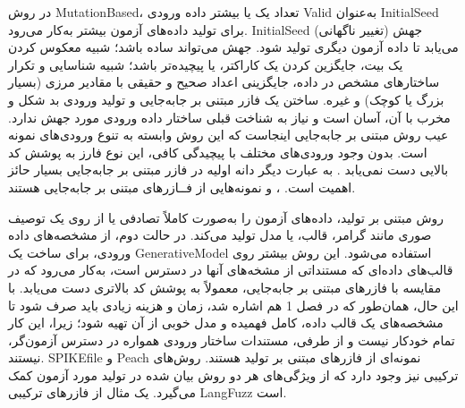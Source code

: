 در روش \gls{MutationBased}، تعداد یک یا بیشتر داده ورودی \gls{Valid} به‌عنوان \gls{InitialSeed} برای تولید داده‌های آزمون بیشتر به‌کار می‌رود.  \gls{InitialSeed} جهش (تغییر ناگهانی) می‌یابد تا داده آزمون دیگری تولید شود. جهش می‌تواند ساده باشد؛ شبیه معکوس کردن یک بیت، جایگزین کردن یک کاراکتر، یا پیچیده‌تر باشد؛ شبیه شناسایی و تکرار ساختارهای مشخص در داده، جایگزینی اعداد صحیح و حقیقی با مقادیر مرزی (بسیار بزرگ یا کوچک) و غیره. ساختن یک فازر مبتنی بر جابه‌جایی و تولید ورودی بد شکل و مخرب با آن، آسان است و نیاز به شناخت قبلی ساختار داده ورودی مورد جهش ندارد. عیب روش مبتنی بر جابه‌جایی اینجاست که این روش وابسته به تنوع ورودی‌های نمونه است. بدون وجود ورودی‌های مختلف با پیچیدگی کافی، این نوع فارز‌ به پوشش کد بالایی دست نمی‌یابد \cite{Kettunen2014}. به عبارت دیگر دانه اولیه در فازر مبتنی بر جابه‌جایی بسیار حائز اهمیت است.
 \cite{Zalewsky2013}، \cite{Sutton:2007:FBF:1324770}
 و
  \cite{Kettunen2014}
 نمونه‌هایی از فــازرهای مبتنی بر جابه‌جایی هستند.
 
 
 روش مبتنی بر تولید، داده‌های آزمون را به‌صورت کاملاً تصادفی یا از روی یک توصیف صوری مانند گرامر، قالب، یا مدل تولید می‌کند. در حالت دوم، از مشخصه‌های داده ورودی، برای ساخت یک \gls{GenerativeModel} استفاده می‌شود. این روش بیشتر روی قالب‌های داده‌ای که مستنداتی از مشخه‌های آنها در دسترس است، به‌کار می‌رود که در مقایسه با فازرهای مبتنی بر جابه‌جایی، معمولاً به پوشش کد بالاتری دست می‌یابد. با این حال، همان‌طور که در فصل 1 هم اشاره شد، زمان و هزینه زیادی باید صرف شود تا مشخصه‌های یک قالب داده، کامل فهمیده و مدل خوبی از آن تهیه شود؛ زیرا، این کار تمام خودکار نیست \cite{Miller2007} و از طرفی، مستندات ساختار ورودی همواره در دسترس آزمون‌گر، نیستند.
 SPIKEfile\cite{Sutton:2007:FBF:1324770} و
 Peach
 نمونه‌ای از فازرهای مبتنی بر تولید هستند. روش‌های ترکیبی نیز وجود دارد که از ویژگی‌های هر دو روش بیان شده در تولید مورد آزمون کمک می‌گیرد. یک مثال از فازرهای ترکیبی LangFuzz \cite{Holler2012} است.
 
 
